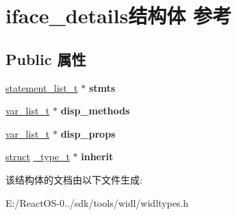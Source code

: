 \hypertarget{structiface__details}{}\section{iface\+\_\+details结构体 参考}
\label{structiface__details}
\subsection*{Public 属性}
\begin{DoxyCompactItemize}
\item 
\mbox{\label{structiface__details_adf6f5507baecfc31aafcd890fdfa32e3}} 
\hyperlink{structstatement__list__t}{statement\+\_\+list\+\_\+t} $\ast$ {\bfseries stmts}
\item 
\mbox{\label{structiface__details_a474004d252dbc1e1f82abe1359147ed8}} 
\hyperlink{classlist}{var\+\_\+list\+\_\+t} $\ast$ {\bfseries disp\+\_\+methods}
\item 
\mbox{\label{structiface__details_ab997102add41ede1fd4c62a3e2e10f78}} 
\hyperlink{classlist}{var\+\_\+list\+\_\+t} $\ast$ {\bfseries disp\+\_\+props}
\item 
\mbox{\label{structiface__details_a22fb313746373a5fb12c11a5e6e2386e}} 
\hyperlink{interfacestruct}{struct} \hyperlink{struct__type__t}{\+\_\+type\+\_\+t} $\ast$ {\bfseries inherit}
\end{DoxyCompactItemize}


该结构体的文档由以下文件生成\+:\begin{DoxyCompactItemize}
\item 
E\+:/\+React\+O\+S-\/0../sdk/tools/widl/widltypes.\+h\end{DoxyCompactItemize}
